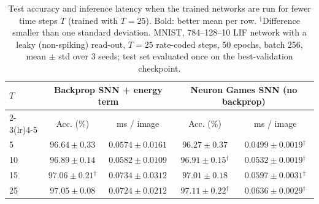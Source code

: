 \documentclass{article}
\begin{document}
\begin{table}[H]
\centering
\small
\caption{Test accuracy and inference latency when the trained networks are run for fewer time steps $T$ (trained with $T=25$). Bold: better mean per row. $^\dagger$Difference smaller than one standard deviation. MNIST, 784--128--10 LIF network with a leaky (non-spiking) read-out, $T=25$ rate-coded steps, 50 epochs, batch 256, mean $\pm$ std over 3 seeds; test set evaluated once on the best-validation checkpoint.}
\label{tab:t2-steps}
\begin{tabular}{lcccc}
\toprule
\multirow{2}{*}{$T$} & \multicolumn{2}{c}{Backprop SNN + energy term} & \multicolumn{2}{c}{Neuron Games SNN (no backprop)} \\
\cmidrule(lr){2-3}\cmidrule(lr){4-5}
 & Acc. (\%) & ms / image & Acc. (\%) & ms / image \\
\midrule
5 & $\boldsymbol{96.64 \pm 0.33}$ & $0.0574 \pm 0.0161$ & $96.27 \pm 0.37$ & $\boldsymbol{0.0499 \pm 0.0019}$$^\dagger$ \\
10 & $96.89 \pm 0.14$ & $0.0582 \pm 0.0109$ & $\boldsymbol{96.91 \pm 0.15}$$^\dagger$ & $\boldsymbol{0.0532 \pm 0.0019}$$^\dagger$ \\
15 & $\boldsymbol{97.06 \pm 0.21}$$^\dagger$ & $0.0734 \pm 0.0312$ & $97.01 \pm 0.18$ & $\boldsymbol{0.0597 \pm 0.0031}$$^\dagger$ \\
25 & $97.05 \pm 0.08$ & $0.0724 \pm 0.0212$ & $\boldsymbol{97.11 \pm 0.22}$$^\dagger$ & $\boldsymbol{0.0636 \pm 0.0029}$$^\dagger$ \\
\bottomrule
\end{tabular}
\end{table}
\end{document}
